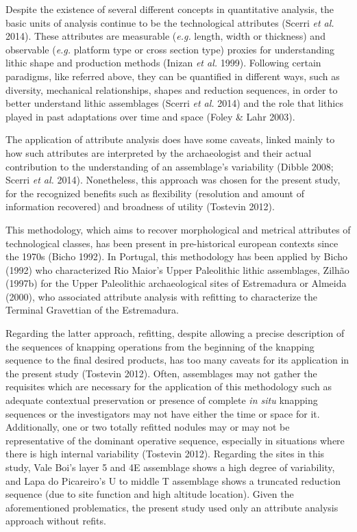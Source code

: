 \documentclass[12pt,twoside]{reedthesis}
\begin{document}
Despite the existence of several different concepts in quantitative analysis, the basic units of analysis continue to be the technological attributes (Scerri \emph{et al.} 2014). These attributes are measurable (\emph{e.g.} length, width or thickness) and observable (\emph{e.g.} platform type or cross section type) proxies for understanding lithic shape and production methods (Inizan \emph{et al.} 1999). Following certain paradigms, like referred above, they can be quantified in different ways, such as diversity, mechanical relationships, shapes and reduction sequences, in order to better understand lithic assemblages (Scerri \emph{et al.} 2014) and the role that lithics played in past adaptations over time and space (Foley \& Lahr 2003).

The application of attribute analysis does have some caveats, linked mainly to how such attributes are interpreted by the archaeologist and their actual contribution to the understanding of an assemblage's variability (Dibble 2008; Scerri \emph{et al.} 2014). Nonetheless, this approach was chosen for the present study, for the recognized benefits such as flexibility (resolution and amount of information recovered) and broadness of utility (Tostevin 2012).

This methodology, which aims to recover morphological and metrical attributes of technological classes, has been present in pre-historical european contexts since the 1970s (Bicho 1992). In Portugal, this methodology has been applied by Bicho (1992) who characterized Rio Maior's Upper Paleolithic lithic assemblages, Zilhão (1997b) for the Upper Paleolithic archaeological sites of Estremadura or Almeida (2000), who associated attribute analysis with refitting to characterize the Terminal Gravettian of the Estremadura.

Regarding the latter approach, refitting, despite allowing a precise description of the sequences of knapping operations from the beginning of the knapping sequence to the final desired products, has too many caveats for its application in the present study (Tostevin 2012). Often, assemblages may not gather the requisites which are necessary for the application of this methodology such as adequate contextual preservation or presence of complete \emph{in situ} knapping sequences or the investigators may not have either the time or space for it. Additionally, one or two totally refitted nodules may or may not be representative of the dominant operative sequence, especially in situations where there is high internal variability (Tostevin 2012). Regarding the sites in this study, Vale Boi's layer 5 and 4E assemblage shows a high degree of variability, and Lapa do Picareiro's U to middle T assemblage shows a truncated reduction sequence (due to site function and high altitude location). Given the aforementioned problematics, the present study used only an attribute analysis approach without refits.
\end{document}
